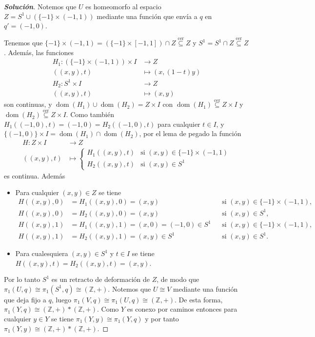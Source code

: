 \begin{proof}[\textbf{Solución}]
Notemos que $U$ es homeomorfo al espacio $Z=S^1\cup(\{-1\}\times(-1,1))$ mediante una función que envía a $q$ en $q'=(-1,0)$.
\begin{center}
\end{center}
Tenemos que $\{-1\}\times(-1,1)=(\{-1\}\times[-1,1])\cap Z\overset{\text{cer}}{\subseteq}Z$ y $S^1=S^1\cap Z\overset{\text{cer}}{\subseteq}Z$. Además, las funciones
\begin{align*}
H_1:(\{-1\}\times(-1,1))\times I&\to Z\\
((x,y),t)&\mapsto(x,(1-t)y)\\
H_2:S^1\times I&\to Z\\
((x,y),t)&\mapsto(x,y)
\end{align*}
son continuas, y $\operatorname{dom}(H_1)\cup\operatorname{dom}(H_2)=Z\times I$ con $\operatorname{dom}(H_1)\overset{\text{cer}}{\subseteq}Z\times I$ y $\operatorname{dom}(H_2)\overset{\text{cer}}{\subseteq}Z\times I$. Como también $H_1((-1,0),t)=(-1,0)=H_2((-1,0),t)$ para cualquier $t\in I$, y $\{(-1,0)\}\times I=\operatorname{dom}(H_1)\cap\operatorname{dom}(H_2)$, por el lema de pegado la función
\begin{align*}
H:Z\times I&\longrightarrow Z\\
((x,y),t)&\longmapsto
\begin{cases}
H_1((x,y),t) & \text{si } (x,y)\in\{-1\}\times(-1,1)\\
H_2((x,y),t) & \text{si } (x,y)\in S^1
\end{cases}
\end{align*}
es continua. Además
\begin{itemize}
\item Para cualquier $(x,y)\in Z$ se tiene
\begin{align*}
H((x,y),0)&=H_1((x,y),0)=(x,y) &&\text{si } (x,y)\in\{-1\}\times(-1,1),\\
H((x,y),0)&=H_2((x,y),0)=(x,y) &&\text{si } (x,y)\in S^1,\\
H((x,y),1)&=H_1((x,y),1)=(x,0)=(-1,0)\in S^1 &&\text{si } (x,y)\in\{-1\}\times(-1,1),\\
H((x,y),1)&=H_2((x,y),1)=(x,y)\in S^1 &&\text{si } (x,y)\in S^1.
\end{align*}
\item Para cualesquiera $(x,y)\in S^1$ y $t\in I$ se tiene $H((x,y),t)=H_2((x,y),t)=(x,y)$.
\end{itemize}
Por lo tanto $S^1$ es un retracto de deformación de $Z$, de modo que $\pi_1(U,q)\cong\pi_1(S^1,q)\cong(\mathbb{Z},+)$. Notemos que $U\cong V$ mediante una función que deja fijo a $q$, luego $\pi_1(V,q)\cong\pi_1(U,q)\cong(\mathbb{Z},+)$. De esta forma, $\pi_1(Y,q)\cong(\mathbb{Z},+)*(\mathbb{Z},+)$. Como $Y$ es conexo por caminos entonces para cualquier $y\in Y$ se tiene $\pi_1(Y,y)\cong\pi_1(Y,q)$ y por tanto $\pi_1(Y,y)\cong(\mathbb{Z},+)*(\mathbb{Z},+)$.
\end{proof}
